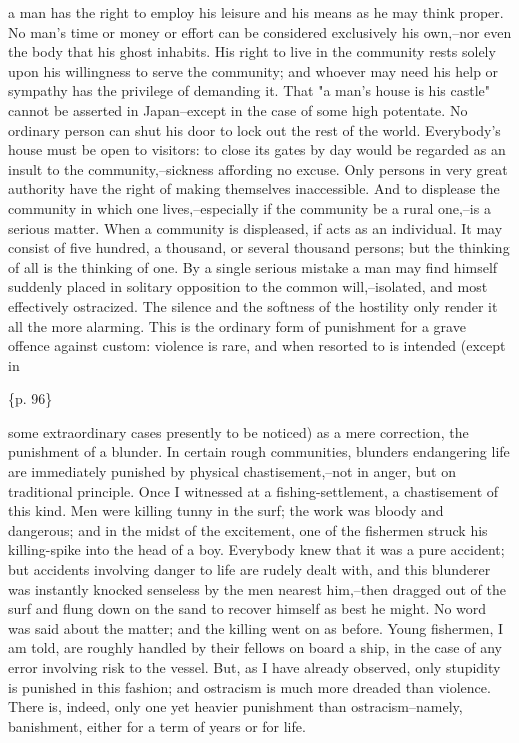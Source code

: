 a man has the right to employ his leisure and his means as he may think proper. No man's time or money or effort can be considered exclusively his own,--nor even the body that his ghost inhabits. His right to live in the community rests solely upon his willingness to serve the community; and whoever may need his help or sympathy has the privilege of demanding it. That "a man's house is his castle" cannot be asserted in Japan--except in the case of some high potentate. No ordinary person can shut his door to lock out the rest of the world. Everybody's house must be open to visitors: to close its gates by day would be regarded as an insult to the community,--sickness affording no excuse. Only persons in very great authority have the right of making themselves inaccessible. And to displease the community in which one lives,--especially if the community be a rural one,--is a serious matter. When a community is displeased, if acts as an individual. It may consist of five hundred, a thousand, or several thousand persons; but the thinking of all is the thinking of one. By a single serious mistake a man may find himself suddenly placed in solitary opposition to the common will,--isolated, and most effectively ostracized. The silence and the softness of the hostility only render it all the more alarming. This is the ordinary form of punishment for a grave offence against custom: violence is rare, and when resorted to is intended (except in

\{p. 96\}

some extraordinary cases presently to be noticed) as a mere correction, the punishment of a blunder. In certain rough communities, blunders endangering life are immediately punished by physical chastisement,--not in anger, but on traditional principle. Once I witnessed at a fishing-settlement, a chastisement of this kind. Men were killing tunny in the surf; the work was bloody and dangerous; and in the midst of the excitement, one of the fishermen struck his killing-spike into the head of a boy. Everybody knew that it was a pure accident; but accidents involving danger to life are rudely dealt with, and this blunderer was instantly knocked senseless by the men nearest him,--then dragged out of the surf and flung down on the sand to recover himself as best he might. No word was said about the matter; and the killing went on as before. Young fishermen, I am told, are roughly handled by their fellows on board a ship, in the case of any error involving risk to the vessel. But, as I have already observed, only stupidity is punished in this fashion; and ostracism is much more dreaded than violence. There is, indeed, only one yet heavier punishment than ostracism--namely, banishment, either for a term of years or for life.

